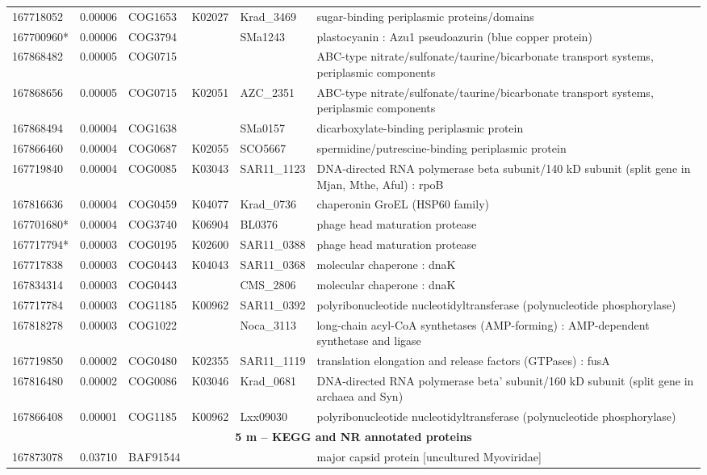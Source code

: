 \begin{landscape}
\begin{longtable}{p{1.8cm}p{0.9cm}p{2.2cm}p{1cm}p{2.8cm}p{13.4cm}}
167718052&0.00006&COG1653&K02027&Krad\_3469&sugar-binding periplasmic proteins/domains \\
167700960*&0.00006&COG3794&&SMa1243&plastocyanin :  Azu1 pseudoazurin (blue copper protein) \\
167868482&0.00005&COG0715&&&ABC-type nitrate/sulfonate/taurine/bicarbonate transport systems, periplasmic components \\
167868656&0.00005&COG0715&K02051&AZC\_2351&ABC-type nitrate/sulfonate/taurine/bicarbonate transport systems, periplasmic components \\
167868494&0.00004&COG1638&&SMa0157&dicarboxylate-binding periplasmic protein \\
167866460&0.00004&COG0687&K02055&SCO5667&spermidine/putrescine-binding periplasmic protein \\
167719840&0.00004&COG0085&K03043&SAR11\_1123&DNA-directed RNA polymerase beta subunit/140 kD subunit (split gene in Mjan, Mthe, Aful) : rpoB \\
167816636&0.00004&COG0459&K04077&Krad\_0736&chaperonin GroEL (HSP60 family) \\
167701680*&0.00004&COG3740&K06904&BL0376&phage head maturation protease \\
167717794*&0.00003&COG0195&K02600&SAR11\_0388&phage head maturation protease \\
167717838&0.00003&COG0443&K04043&SAR11\_0368&molecular chaperone : dnaK \\
167834314&0.00003&COG0443&&CMS\_2806&molecular chaperone : dnaK \\
167717784&0.00003&COG1185&K00962&SAR11\_0392&polyribonucleotide nucleotidyltransferase (polynucleotide phosphorylase) \\
167818278&0.00003&COG1022&&Noca\_3113&long-chain acyl-CoA synthetases (AMP-forming) : AMP-dependent synthetase and ligase \\
167719850&0.00002&COG0480&K02355&SAR11\_1119&translation elongation and release factors (GTPases) : fusA \\
167816480&0.00002&COG0086&K03046&Krad\_0681&DNA-directed RNA polymerase beta' subunit/160 kD subunit (split gene in archaea and Syn) \\
167866408&0.00001&COG1185&K00962&Lxx09030&polyribonucleotide nucleotidyltransferase (polynucleotide phosphorylase) \\
\toprule
\multicolumn{6}{c}{\textbf{ 5 m -- \acs{KEGG} and \acs{NR} annotated proteins}} \\
\midrule
167873078&0.03710&BAF91544&&&major capsid protein [uncultured Myoviridae] \\

\end{longtable}
\end{landscape}
